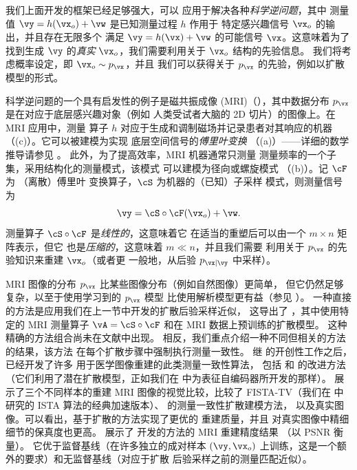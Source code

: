 \documentclass[../../book-main_zh.tex]{subfiles}
\begin{document}
我们上面开发的框架已经足够强大，可以
应用于解决各种\textit{科学逆问题}，其中
测量值
$\vy = h(\vx_o) + \vw$ 是已知测量过程 $h$ 作用于
特定感兴趣信号 $\vx_o$ 的输出，并且存在无限多个
满足 $\vy = h(\vx) + \vw$ 的可能信号 $\vx$。这意味着为了
找到生成 $\vy$ 的\textit{真实} $\vx_o$，我们需要利用关于
$\vx_o$ 结构的先验信息。
我们将考虑概率设定，即 $\vx_o \sim p_{\vx}$，并且
我们可以获得关于 $p_{\vx}$ 的先验，例如以扩散模型的形式。

科学逆问题的一个具有启发性的例子是磁共振成像 (MRI)（），其中数据分布
$p_{\vx}$ 是在对应于底层感兴趣对象（例如
人类受试者大脑的 2D 切片）的图像上。在 MRI 应用中，测量
算子 $h$ 对应于生成和调制磁场并记录患者对其响应的机器
（(c)）。它可以被建模为实现
底层空间信号的\textit{傅里叶变换}
（(a)）——详细的数学推导请参见 \cite[第 10 章]{Wright-Ma-2022}。
此外，为了提高效率，MRI 机器通常只测量
测量频率的一个子集，采用结构化的测量模式，该模式
可以建模为径向或螺旋模式
（(b)）。记 $\cF$ 为
（离散）傅里叶
变换算子，$\cS$ 为机器的（已知）子采样
模式，则测量信号为
\begin{equation}\label{eq:mri-measurement}
    \vy = \cS \circ \cF(\vx_o) + \vw.
\end{equation}
测量算子 $\cS \circ \cF$ 是\textit{线性的}，这意味着它
在适当的重塑后可以由一个 $m \times n$ 矩阵表示，但它
也是\textit{压缩的}，这意味着 $m \ll n$，并且我们需要
利用关于 $p_{\vx}$ 的先验知识来重建 $\vx_o$（或者更
一般地，从后验 $p_{\vx \mid \vy}$ 中采样）。

MRI 图像的分布
$p_{\vx}$ 比某些图像分布（例如自然图像）更简单，
但它仍然足够复杂，以至于使用学习到的 $p_{\vx}$ 模型
比使用解析模型更有益（参见 \cite{Wright-Ma-2022}）。
一种直接的方法是应用我们在上一节中开发的扩散后验采样近似，
这导出了
，其中使用特定的 MRI
测量算子 $\vA = \cS \circ \cF$ 和在 MRI 数据上预训练的扩散模型。
这种精确的方法组合尚未在文献中出现。
相反，我们重点介绍一种不同但相关的方法的结果，该方法
在每个扩散步骤中强制执行测量一致性。
继 \textcite{song2022solving} 的开创性工作之后，已经开发了许多
用于医学图像重建的此类测量一致性算法，
包括 \textcite{song2024solving} 和
\textcite{rout2023solving} 的改进方法（它们利用了潜在扩散模型，正如我们在
 中为表征自编码器所开发的那样）。
 展示了三个不同样本的重建
MRI 图像的视觉比较，比较了 FISTA-TV（我们在
 中研究的 ISTA 算法的经典加速版本）、
\textcite{song2022solving} 的测量一致性扩散建模方法，
以及真实图像。可以看出，基于扩散的方法实现了更优的
重建质量，并且
对真实图像中精细细节的保真度也更高。
 展示了 \textcite{song2022solving} 开发的方法的 MRI 重建精度结果
（以 PSNR 衡量）。
它优于监督基线（在许多独立的成对样本 $(\vy,
\vx_o)$ 上训练，这是一个额外的要求）和无监督基线（对应于扩散
后验采样之前的测量匹配近似）。
\end{document}
